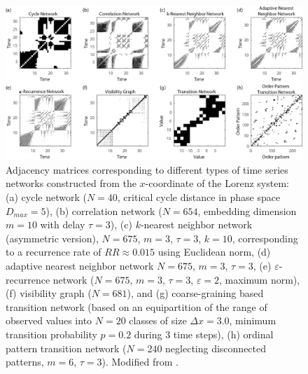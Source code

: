 \begin{figure}[htbp]
	\centering
	\includegraphics[width=\textwidth]{Chapter01_Introduction/lorenz_adj-matrix.eps} 
\caption{Adjacency matrices corresponding to different types of time series networks constructed from the $x$-coordinate of the Lorenz system: (a) cycle network ($N=40$, critical cycle distance in phase space $D_{max}=5$), (b) correlation network ($N=654$, embedding dimension $m=10$ with delay $\tau=3$), (c) $k$-nearest neighbor network {(asymmetric version)}, $N=675$, $m=3$, $\tau=3$, $k=10$, corresponding to a recurrence rate of $RR\approx 0.015$ using Euclidean norm, (d) adaptive nearest neighbor network $N=675$, $m=3$, $\tau=3$, (e) $\varepsilon$-recurrence network ($N=675$, $m=3$, $\tau=3$, $\varepsilon=2$, maximum norm), (f) visibility graph ($N=681$), and (g) coarse-graining based transition network (based on an equipartition of the range of observed values into $N=20$ classes of size $\Delta x=3.0$, minimum transition probability $p=0.2$ during 3 time steps), (h) ordinal pattern transition network ($N=240$ neglecting disconnected patterns, $m=6$, $\tau=3$). Modified from \cite{Donner2011}. } \label{fig:lorenz_adj-matrices}
\end{figure}
